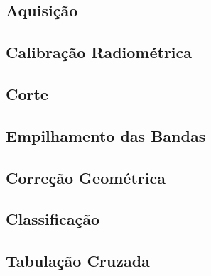 \subsection{Aquisição}

\subsection{Calibração Radiométrica}

\subsection{Corte}

\subsection{Empilhamento das Bandas}

\subsection{Correção Geométrica}

\subsection{Classificação}

\subsection{Tabulação Cruzada}
